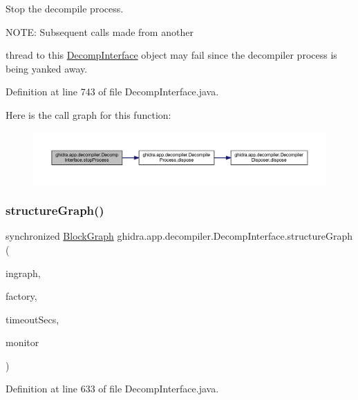 Stop the decompile process.

N\+O\+TE\+: Subsequent calls made from another

thread to this \mbox{\hyperlink{classghidra_1_1app_1_1decompiler_1_1_decomp_interface}{Decomp\+Interface}} object may fail since the decompiler process is being yanked away. 

Definition at line 743 of file Decomp\+Interface.\+java.

Here is the call graph for this function\+:
\nopagebreak
\begin{figure}[H]
\begin{center}
\leavevmode
\includegraphics[width=350pt]{classghidra_1_1app_1_1decompiler_1_1_decomp_interface_a9c46f9ab1edab88fecfb1ff9faa2d1df_cgraph}
\end{center}
\end{figure}
\mbox{\label{classghidra_1_1app_1_1decompiler_1_1_decomp_interface_a5cd68852b39b8dc136790b8741ee029d}} 
\subsubsection{\texorpdfstring{structureGraph()}{structureGraph()}}
{\footnotesize\ttfamily synchronized \mbox{\hyperlink{class_block_graph}{Block\+Graph}} ghidra.\+app.\+decompiler.\+Decomp\+Interface.\+structure\+Graph (\begin{DoxyParamCaption}\item[{\mbox{\hyperlink{class_block_graph}{Block\+Graph}}}]{ingraph,  }\item[{Address\+Factory}]{factory,  }\item[{int}]{timeout\+Secs,  }\item[{Task\+Monitor}]{monitor }\end{DoxyParamCaption})\hspace{0.3cm}{\ttfamily [inline]}}



Definition at line 633 of file Decomp\+Interface.\+java.

